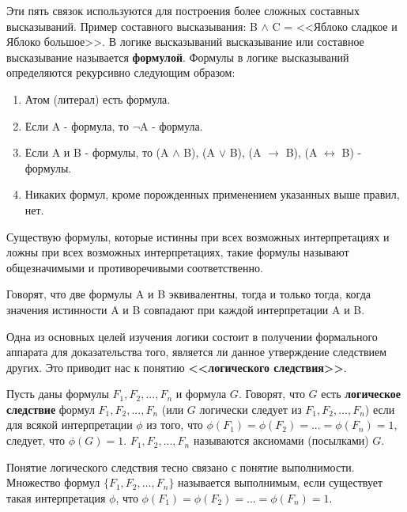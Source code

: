 \documentclass[12pt, a4paper]{article}
\begin{document}
	 Эти пять связок используются для построения более сложных составных высказываний. Пример составного высказывания: B $\land$ C = <<Яблоко сладкое и Яблоко большое>>.  В логике высказываний высказывание или составное высказывание называется \textbf{формулой}. Формулы в логике высказываний определяются рекурсивно следующим образом:
	 \begin{enumerate}
	 	\item Атом (литерал) есть формула.
	 	\item Если A - формула, то $\neg$A - формула.
	 	\item Если A и B - формулы, то (A $\land$ B), (A $\lor$ B), (A $\rightarrow$ B), (A $\leftrightarrow$ B) - формулы.
	 	\item Никаких формул, кроме порожденных применением указанных выше правил, нет.
	 \end{enumerate}
	 \par Существую формулы, которые истинны при всех возможных интерпретациях и ложны при всех возможных интерпретациях, такие формулы называют общезначимыми и противоречивыми соответственно.
	 \par Говорят, что две формулы A и B эквивалентны, тогда и только тогда, когда значения истинности A и B совпадают при каждой интерпретации A и B.
	 \par Одна из основных целей изучения логики состоит в получении формального аппарата для доказательства того, является ли данное утверждение следствием других. Это приводит нас к понятию \textbf{<<логического следствия>>}. 
	 \par Пусть даны формулы $F_{1}, F_{2},  ... , F_{n}$ и формула $G$. Говорят, что $G$ есть \textbf{логическое следствие} формул $F_{1}, F_{2}, ... , F_{n}$ (или $G$ логически следует из $F_{1}, F_{2}, ... , F_{n}$) если для всякой интерпретации $\phi$ из того, что $\phi (F_{1}) = \phi (F_{2}) = ... = \phi (F_{n}) = 1$, следует, что $\phi(G) = 1$. $F_{1}, F_{2}, ... , F_{n}$ называются аксиомами (посылками) $G$.
	 \par Понятие логического следствия тесно связано с понятие выполнимости. Множество формул $ \{F_{1}, F_{2}, ... , F_{n}\}$ называется выполнимым, если существует такая интерпретация $\phi$, что $\phi (F_{1}) = \phi (F_{2}) = ... = \phi (F_{n}) = 1$.
	 
\end{document}
